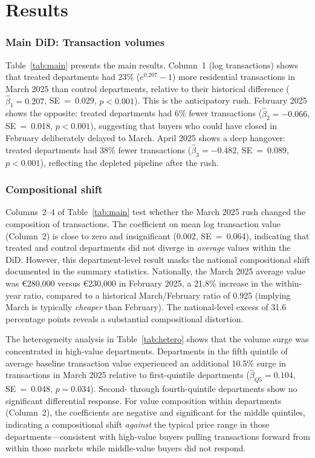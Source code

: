 \documentclass[12pt]{article}
\begin{document}
\section{Results}

\subsubsection*{Main DiD: Transaction volumes}
Table~\ref{tab:main} presents the main results. Column~1 (log transactions) shows that
treated departments had 23\% ($e^{0.207} - 1$) more residential transactions in March 2025
than control departments, relative to their historical difference ($\hat{\beta}_1 = 0.207$,
SE~=~0.029, $p < 0.001$). This is the anticipatory rush. February 2025 shows the opposite:
treated departments had 6\% fewer transactions ($\hat{\beta}_2 = -0.066$, SE~=~0.018,
$p < 0.001$), suggesting that buyers who could have closed in February deliberately delayed
to March. April 2025 shows a deep hangover: treated departments had 38\% fewer transactions
($\hat{\beta}_3 = -0.482$, SE~=~0.089, $p < 0.001$), reflecting the depleted pipeline after
the rush.



\subsubsection*{Compositional shift}
Columns~2--4 of Table~\ref{tab:main} test whether the March 2025 rush changed the
composition of transactions. The coefficient on mean log transaction value (Column~2) is
close to zero and insignificant (0.002, SE~=~0.064), indicating that treated and control
departments did not diverge in \textit{average} values within the DiD. However, this
department-level result masks the national compositional shift documented in the summary
statistics. Nationally, the March 2025 average value was \euro{}280,000 versus
\euro{}230,000 in February 2025, a 21.8\% increase in the within-year ratio, compared to a
historical March/February ratio of 0.925 (implying March is typically \textit{cheaper} than
February). The national-level excess of 31.6 percentage points reveals a substantial
compositional distortion.

The heterogeneity analysis in Table~\ref{tab:hetero} shows that the volume surge was concentrated
in high-value departments. Departments in the fifth quintile of average baseline transaction value
experienced an additional 10.5\% surge in transactions in March 2025 relative to
first-quintile departments ($\hat{\beta}_{Q5} = 0.104$, SE~=~0.048, $p = 0.034$).
Second- through fourth-quintile departments show no significant differential response.
For value composition within departments (Column~2), the coefficients are negative and significant
for the middle quintiles, indicating a compositional shift \textit{against} the typical
price range in those departments---consistent with high-value buyers pulling transactions
forward from within those markets while middle-value buyers did not respond.
\end{document}
